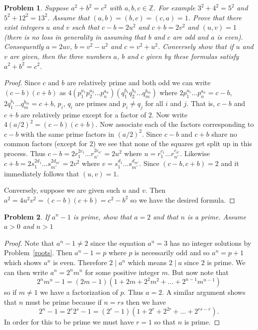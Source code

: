 \documentclass{article}
\newtheorem{problem}{Problem}
\begin{document}
\begin{problem}
Suppose $a^2 + b^2 = c^2$ with $a,b,c \in \mathbb{Z}$. For example $3^2 + 4^2 = 5^2$ and $5^2 + 12^2 = 13^2$. Assume that $(a,b) = (b,c) = (c,a) = 1$. Prove that there exist integers $u$ and $v$ such that $c - b = 2u^2$ and $c + b = 2v^2$ and $(u,v) = 1$ (there is no loss in generality in assuming that $b$ and $c$ are odd and $a$ is even). Consequently $a = 2uv$, $b = v^2 - u^2$ and $c = v^2 + u^2$. Conversely show that if $u$ and $v$ are given, then the three numbers $a$, $b$ and $c$ given by these formulas satisfy $a^2 + b^2 = c^2$.
\end{problem}
\begin{proof}
Since $c$ and $b$ are relatively prime and both odd we can write $(c-b)(c+b)$ as $4(p_1^{a_1}p_2^{a_2} \dots p_n^{a_n})(q_1^{b_1}q_2^{b_2} \dots q_m^{b_m})$ where $2p_1^{a_1} \dots p_n^{a_n} = c-b$, $2q_1^{b_1} \dots q_m^{b_m} = c+b$, $p_i$, $q_i$ are primes and $p_i \neq q_j$ for all $i$ and $j$. That is, $c-b$ and $c+b$ are relatively prime except for a factor of $2$. Now write $4(a/2)^2 = (c-b)(c+b)$. Now associate each of the factors corresponding to $c-b$ with the same prime factors in $(a/2)^2$. Since $c-b$ and $c+b$ share no common factors (except for $2$) we see that none of the squares get split up in this process. Thus $c-b = 2r_1^{2c_1} \dots r_{n'}^{2c_{n'}} = 2u^2$ where $u = r_1^{c_1} \dots r_{n'}^{c_{n'}}$. Likewise $c+b = 2s_1^{2d_1} \dots s_{m'}^{2d_{m'}} = 2v^2$ where $v = s_1^{d_1} \dots s_{m'}^{d_{m'}}$. Since $(c-b,c+b) = 2$ and it immediately follows that $(u,v) = 1$.

Conversely, suppose we are given such $u$ and $v$. Then $a^2 = 4u^2v^2 = (c-b)(c+b) = c^2-b^2$ so we have the desired formula.
\end{proof}

\begin{problem}
If $a^n-1$ is prime, show that $a = 2$ and that $n$ is a prime. Assume $a > 0$ and $n > 1$
\end{problem}
\begin{proof}
Note that $a^n-1 \neq 2$ since the equation $a^n = 3$ has no integer solutions by Problem~\ref{roots}. Then $a^n-1 = p$ where $p$ is necessarily odd and so $a^n = p+1$ which shows $a^n$ is even. Therefore $2 \mid a^n$ which means $2 \mid a$ since $2$ is prime. We can then write $a^n = 2^nm^n$ for some positive integer $m$. But now note that
\[
2^nm^n - 1 = (2m-1)(1 + 2m + 2^2m^2 + \dots + 2^{n-1}m^{n-1})
\]
so if $m \neq 1$ we have a factorization of $p$. Thus $a = 2$. A similar argument shows that $n$ must be prime because if $n = rs$ then we have
\[
2^n - 1 = 2^r2^s - 1 = (2^r - 1)(1 + 2^r + 2^{2r} + \dots + 2^{rs - r}).
\]
In order for this to be prime we must have $r = 1$ so that $n$ is prime.
\end{proof}
\end{document}
